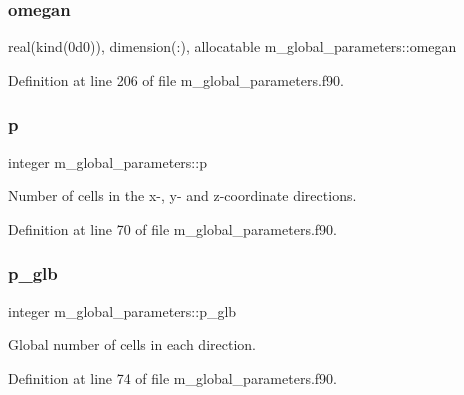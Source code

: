\subsubsection{\texorpdfstring{omegan}{omegan}}
{\footnotesize\ttfamily real(kind(0d0)), dimension(\+:), allocatable m\+\_\+global\+\_\+parameters\+::omegan}



Definition at line 206 of file m\+\_\+global\+\_\+parameters.\+f90.

\mbox{\label{namespacem__global__parameters_ac040dbf547e6d5de8df08e864d8131e7}} 
\subsubsection{\texorpdfstring{p}{p}}
{\footnotesize\ttfamily integer m\+\_\+global\+\_\+parameters\+::p}



Number of cells in the x-\/, y-\/ and z-\/coordinate directions. 



Definition at line 70 of file m\+\_\+global\+\_\+parameters.\+f90.

\mbox{\label{namespacem__global__parameters_a1072f221ca8e41b0ea3240b33374cc1e}} 
\subsubsection{\texorpdfstring{p\+\_\+glb}{p\_glb}}
{\footnotesize\ttfamily integer m\+\_\+global\+\_\+parameters\+::p\+\_\+glb}



Global number of cells in each direction. 



Definition at line 74 of file m\+\_\+global\+\_\+parameters.\+f90.

\mbox{\label{namespacem__global__parameters_ac127ac2a9036e1cdb7e6c41159cacdfb}} 
